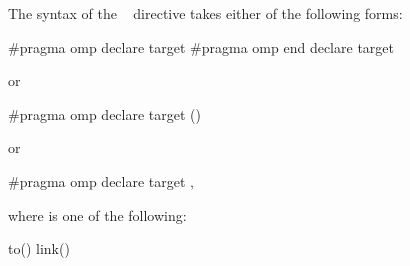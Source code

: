 \syntax
\begin{ccppspecific}
The syntax of the ~ directive takes either of 
the following forms:

\begin{boxedcode}
\#pragma omp declare target 
\#pragma omp end declare target 
\end{boxedcode}

or

\begin{boxedcode}
\#pragma omp declare target () 
\end{boxedcode}

or

\begin{boxedcode}
\#pragma omp declare target \plc{clause[ [},\plc{] clause ... ] new-line}
\end{boxedcode}

where  is one of the following:

\begin{indentedcodelist}
to()
link()
\end{indentedcodelist}
\end{ccppspecific}

